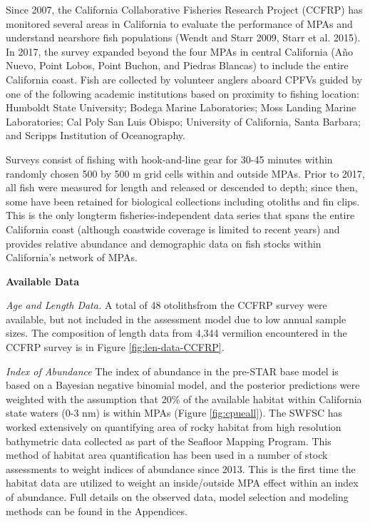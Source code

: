 \documentclass[
  english,
  a4paper,
]{article}
\begin{document}
Since 2007, the California Collaborative Fisheries Research Project (CCFRP)
has monitored several areas in California to
evaluate the performance of MPAs and understand nearshore fish populations
(Wendt and Starr 2009, Starr et al. 2015). In 2017, the survey expanded beyond the four
MPAs in central California
(Año Nuevo, Point Lobos, Point Buchon, and Piedras Blancas)
to include the entire California coast.
Fish are collected by volunteer anglers aboard CPFVs guided by one of
the following academic institutions based on proximity to fishing location:
Humboldt State University;
Bodega Marine Laboratories;
Moss Landing Marine Laboratories;
Cal Poly San Luis Obispo;
University of California, Santa Barbara; and
Scripps Institution of Oceanography.

Surveys consist of fishing with hook-and-line gear for 30-45 minutes within
randomly chosen 500 by 500 m grid cells within and outside MPAs.
Prior to 2017, all fish were measured for length and released or descended to depth;
since then, some have been retained for biological collections including otoliths and fin clips.
This is the only longterm fisheries-independent data series that spans the entire California
coast (although coastwide coverage is limited to recent years) and provides relative abundance and demographic data on fish stocks within California's network of MPAs.

\textbf{Available Data}

\emph{Age and Length Data.} A total of 48 otolithsfrom the CCFRP survey were available, but not included in the
assessment model due to low
annual sample sizes. The composition of length data from 4,344 vermilion encountered
in the CCFRP survey is in Figure \ref{fig:len-data-CCFRP}.

\emph{Index of Abundance}
The index of abundance in the pre-STAR base model is based on a Bayesian negative binomial
model, and the posterior predictions were weighted with the assumption that 20\% of
the available habitat within California state waters (0-3 nm) is within MPAs (Figure \ref{fig:cpueall}).
The SWFSC has worked extensively on quantifying area of rocky habitat from high resolution
bathymetric data collected as part of the Seafloor Mapping Program. This method of habitat area quantification has been used in a number of stock assessments to weight indices of abundance
since 2013. This is the first time the habitat data are utilized to weight an inside/outside
MPA effect within an index of abundance. Full details on the observed data, model selection and modeling methods can be found in the Appendices.
\end{document}
